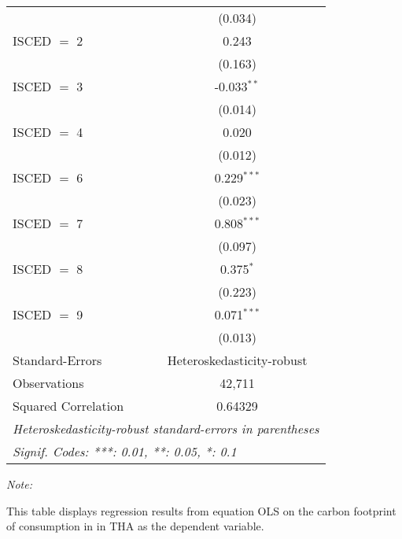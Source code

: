\begin{table}[htbp!]
\begin{adjustbox}{width = 1\textwidth, max height = 0.95\textheight, center}
\begin{threeparttable}[b]
\begin{tabular}{lc}
                                & (0.034)\\   
            ISCED $=$ 2         & 0.243\\   
                                & (0.163)\\   
            ISCED $=$ 3         & -0.033$^{**}$\\   
                                & (0.014)\\   
            ISCED $=$ 4         & 0.020\\   
                                & (0.012)\\   
            ISCED $=$ 6         & 0.229$^{***}$\\   
                                & (0.023)\\   
            ISCED $=$ 7         & 0.808$^{***}$\\   
                                & (0.097)\\   
            ISCED $=$ 8         & 0.375$^{*}$\\   
                                & (0.223)\\   
            ISCED $=$ 9         & 0.071$^{***}$\\   
                                & (0.013)\\   
            \midrule 
            Standard-Errors     & Heteroskedasticity-robust \\   
            Observations        & 42,711\\  
            Squared Correlation & 0.64329\\  
            \midrule \midrule
            \multicolumn{2}{l}{\emph{Heteroskedasticity-robust standard-errors in parentheses}}\\
            \multicolumn{2}{l}{\emph{Signif. Codes: ***: 0.01, **: 0.05, *: 0.1}}\\
         \end{tabular}
         
         \begin{tablenotes}\item \medskip \textit{Note:}
            \item This table displays regression results from equation OLS on the carbon footprint of consumption in  in THA as the dependent variable.  
         \end{tablenotes}
      \end{threeparttable}
   \end{adjustbox}
\end{table}


